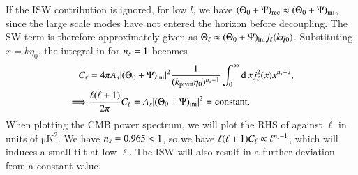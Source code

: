 If the ISW contribution is ignored, for low $l$, we have $(\Theta_0 + \Psi)_\mathrm{rec}\approx(\Theta_0 + \Psi)_\mathrm{ini}$, since the large scale modes have not entered the horizon before decoupling. The SW term is therefore approximately given as $\Theta_\ell\approx (\Theta_0 + \Psi)_\mathrm{ini} j_\ell(k\eta_0)$. Substituting $x=k\eta_0$, the integral in  for $n_s=1$ becomes 
\begin{equation} \label{eq:M4:theory:C_ell_SW_plateau_integral}
    \begin{split}
        C_\ell &= 4\pi A_s \abs{(\Theta_0+\Psi)_\mathrm{ini}}^2 \frac{1}{(k_\mathrm{pivot} \eta_0)^{n_s-1}} \int_0^\infty \dd\, x j_\ell^2(x) x^{n_s-2}, \\
        \implies& \frac{\ell(\ell+1)}{2\pi}C_\ell = A_s \abs{(\Theta_0+\Psi)_\mathrm{ini}}^2 = \text{constant}.   
    \end{split}
\end{equation}
When plotting the CMB power spectrum, we will plot the RHS of  against $\ell$ in units of $\mathrm{\mu K^2}$. We have $n_s=0.965<1$, so we have $\ell(\ell+1)C_\ell\propto \ell^{n_s-1}$, which will induces a small tilt at low $\ell$. The ISW will also result in a further deviation from a constant value. 